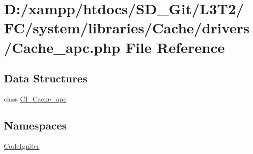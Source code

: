 \hypertarget{system_2libraries_2_cache_2drivers_2_cache__apc_8php}{}\section{D\+:/xampp/htdocs/\+S\+D\+\_\+\+Git/\+L3\+T2/\+F\+C/system/libraries/\+Cache/drivers/\+Cache\+\_\+apc.php File Reference}
\label{system_2libraries_2_cache_2drivers_2_cache__apc_8php}
\subsection*{Data Structures}
\begin{DoxyCompactItemize}
\item 
class \hyperlink{class_c_i___cache__apc}{C\+I\+\_\+\+Cache\+\_\+apc}
\end{DoxyCompactItemize}
\subsection*{Namespaces}
\begin{DoxyCompactItemize}
\item 
 \hyperlink{namespace_code_igniter}{Code\+Igniter}
\end{DoxyCompactItemize}
